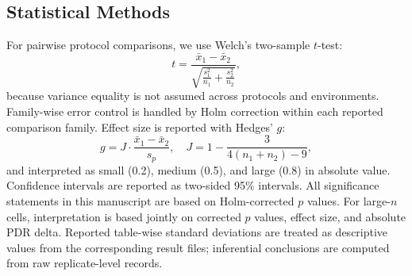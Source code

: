 ﻿\documentclass[sensors,article,submit,moreauthors,pdftex]{Definitions/mdpi}
\begin{document}
\begin{table}[H]
\caption{Evidence-regime map used in this manuscript.}
\label{tab:regime_map}
\centering
{}
\end{table}

\subsection{Statistical Methods}
For pairwise protocol comparisons, we use Welch's two-sample $t$-test:
\begin{equation}
t=\frac{\bar{x}_1-\bar{x}_2}{\sqrt{\frac{s_1^2}{n_1}+\frac{s_2^2}{n_2}}},
\end{equation}
because variance equality is not assumed across protocols and environments. Family-wise error control is handled by Holm correction within each reported comparison family. Effect size is reported with Hedges' $g$:
\begin{equation}
g = J\cdot\frac{\bar{x}_1-\bar{x}_2}{s_p},\quad
J=1-\frac{3}{4(n_1+n_2)-9},
\end{equation}
and interpreted as small (0.2), medium (0.5), and large (0.8) in absolute value. Confidence intervals are reported as two-sided 95\% intervals. All significance statements in this manuscript are based on Holm-corrected $p$ values. For large-$n$ cells, interpretation is based jointly on corrected $p$ values, effect size, and absolute PDR delta. Reported table-wise standard deviations are treated as descriptive values from the corresponding result files; inferential conclusions are computed from raw replicate-level records.
\end{document}
